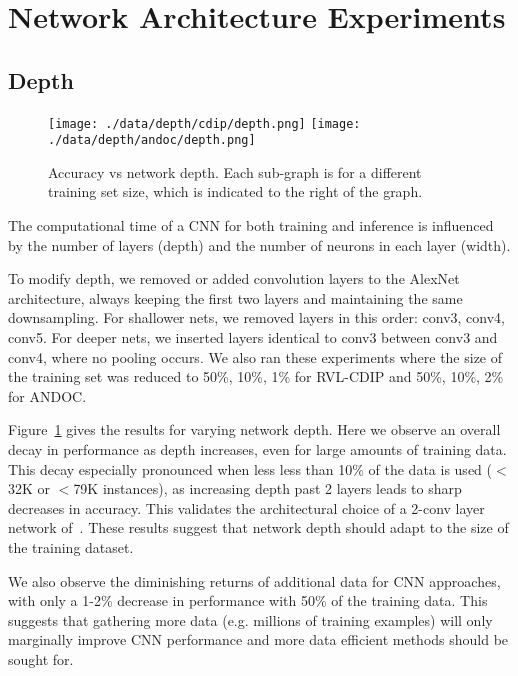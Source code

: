 \documentclass[10pt, conference, compsocconf]{IEEEtran}
\newcommand{\squeezeup}{\vspace{-2.5mm}}
\begin{document}
\section{Network Architecture Experiments}

\subsection{Depth}

\begin{figure}

\texttt{[image: ./data/depth/cdip/depth.png]}
\texttt{[image: ./data/depth/andoc/depth.png]}

\caption{Accuracy vs network depth.  Each sub-graph is for a different training set size, which is indicated to the right of the graph.}
\label{fig:depth}
\squeezeup
\end{figure}

The computational time of a CNN for both training and inference is influenced by the number of layers (depth) and the number of neurons in each layer (width).

To modify depth, we removed or added convolution layers to the AlexNet architecture, always keeping the first two layers and maintaining the same downsampling.
For shallower nets, we removed layers in this order: conv3, conv4, conv5.
For deeper nets, we inserted layers identical to conv3 between conv3 and conv4, where no pooling occurs.
We also ran these experiments where the size of the training set was reduced to 50\%, 10\%, 1\% for RVL-CDIP and 50\%, 10\%, 2\% for ANDOC.

Figure~\ref{fig:depth} gives the results for varying network depth.
Here we observe an overall decay in performance as depth increases, even for large amounts of training data.
This decay especially pronounced when less less than 10\% of the data is used ($<$32K or $<$79K instances), as increasing depth past 2 layers leads to sharp decreases in accuracy.
This validates the architectural choice of a 2-conv layer network of~\cite{kang14}.
These results suggest that network depth should adapt to the size of the training dataset.

We also observe the diminishing returns of additional data for CNN approaches, with only a 1-2\% decrease in performance with 50\% of the training data.
This suggests that gathering more data (e.g. millions of training examples) will only marginally improve CNN performance and more data efficient methods should be sought for. 
\end{document}
